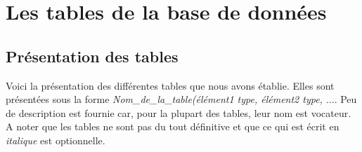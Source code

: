 \section{Les tables de la base de donn\'ees}

\subsection{Pr\'esentation des tables}
Voici la pr\'esentation des diff\'erentes tables que nous avons \'etablie. Elles sont pr\'esent\'ees sous la forme \textit{Nom\_de\_la\_table(\'el\'ement1 type, \'el\'ement2 type, $\dots$}. Peu de description est fournie car, pour la plupart des tables, leur nom est vocateur. A noter que les tables ne sont pas du tout d\'efinitive et que ce qui est \'ecrit en \textit{italique} est optionnelle.\bigskip

